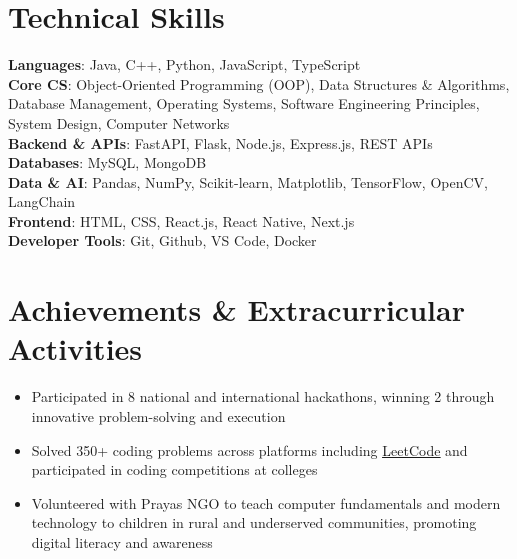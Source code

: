\documentclass[letterpaper,11pt]{article}
\newcommand{\resumeItem}[1]{
    \item\small{#1}
}
\newcommand{\resumeItemListStart}{
    \begin{itemize}[
        leftmargin=0.18in,
        topsep=0pt,
        partopsep=0pt,
        parsep=0pt,
        itemsep=0pt
    ]
}
\newcommand{\resumeItemListEnd}{
    \end{itemize}
}
\begin{document}
\section{Technical Skills}
\begin{itemize}[leftmargin=0.15in, label={}]
\small{\item{
\textbf{Languages}{: Java, C++, Python, JavaScript, TypeScript} \\
\textbf{Core CS}{:  Object-Oriented Programming (OOP), Data Structures \& Algorithms, Database Management, Operating Systems, Software Engineering Principles, System Design, Computer Networks
} \\
\textbf{Backend \& APIs}{:  FastAPI, Flask, Node.js, Express.js, REST APIs} \\
\textbf{Databases}{: MySQL, MongoDB} \\
\textbf{Data \& AI}{: Pandas, NumPy, Scikit-learn, Matplotlib, TensorFlow, OpenCV, LangChain}\\
\textbf{Frontend}{: HTML, CSS, React.js, React Native, Next.js} \\
\textbf{Developer Tools}{: Git, Github, VS Code, Docker}
}}
\end{itemize}

\section{Achievements \& Extracurricular Activities}
\resumeItemListStart
    \resumeItem{Participated in 8 national and international hackathons, winning 2 through innovative problem-solving and execution}
    \resumeItem{Solved 350+ coding problems across platforms including \href{https://leetcode.com/u/saadziaatharkhan/}{\underline{LeetCode}} and participated in coding competitions at colleges}
    \resumeItem{Volunteered with Prayas NGO to teach computer fundamentals and modern technology to children in rural and underserved communities, promoting digital literacy and awareness}
\resumeItemListEnd


\end{document}
